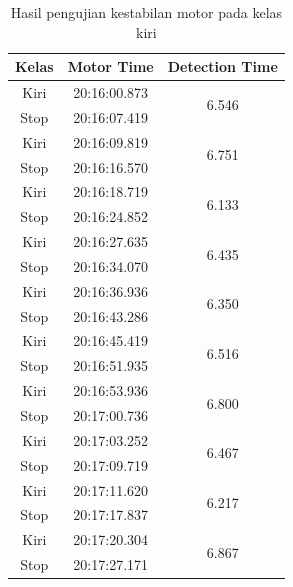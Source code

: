 \begin{longtable}{|c|c|c|}
  \caption{Hasil pengujian kestabilan motor pada kelas kiri} 
  \label{tb:motorkiri} \\
  \hline
  \rowcolor[HTML]{C0C0C0} 
  \textbf{Kelas} & \textbf{Motor Time} & \textbf{Detection Time} \\ \hline
  Kiri           & 20:16:00.873        & \multirow{2}{*}{6.546}  \\ \cline{1-2}
  Stop           & 20:16:07.419        &                         \\ \hline
  Kiri           & 20:16:09.819        & \multirow{2}{*}{6.751}  \\ \cline{1-2}
  Stop           & 20:16:16.570        &                         \\ \hline
  Kiri           & 20:16:18.719        & \multirow{2}{*}{6.133}  \\ \cline{1-2}
  Stop           & 20:16:24.852        &                         \\ \hline
  Kiri           & 20:16:27.635        & \multirow{2}{*}{6.435}  \\ \cline{1-2}
  Stop           & 20:16:34.070        &                         \\ \hline
  Kiri           & 20:16:36.936        & \multirow{2}{*}{6.350}  \\ \cline{1-2}
  Stop           & 20:16:43.286        &                         \\ \hline
  Kiri           & 20:16:45.419        & \multirow{2}{*}{6.516}  \\ \cline{1-2}
  Stop           & 20:16:51.935        &                         \\ \hline
  Kiri           & 20:16:53.936        & \multirow{2}{*}{6.800}  \\ \cline{1-2}
  Stop           & 20:17:00.736        &                         \\ \hline
  Kiri           & 20:17:03.252        & \multirow{2}{*}{6.467}  \\ \cline{1-2}
  Stop           & 20:17:09.719        &                         \\ \hline
  Kiri           & 20:17:11.620        & \multirow{2}{*}{6.217}  \\ \cline{1-2}
  Stop           & 20:17:17.837        &                         \\ \hline
  Kiri           & 20:17:20.304        & \multirow{2}{*}{6.867}  \\ \cline{1-2}
  Stop           & 20:17:27.171        &                         \\ \hline

\end{longtable}
